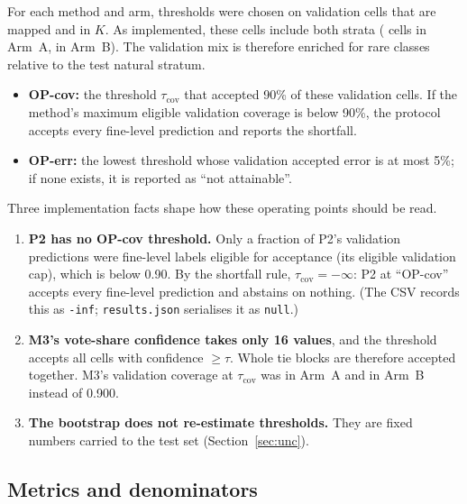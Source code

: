 \documentclass[11pt]{article}
\begin{document}
For each method and arm, thresholds were chosen on validation cells that are mapped and in $K$. As implemented, these cells include both strata ( cells in Arm~A,  in Arm~B). The validation mix is therefore enriched for rare classes relative to the test natural stratum.

\begin{itemize}
\item \textbf{OP-cov:} the threshold $\tau_\mathrm{cov}$ that accepted 90\% of these validation cells. If the method's maximum eligible validation coverage is below 90\%, the protocol accepts every fine-level prediction and reports the shortfall.
\item \textbf{OP-err:} the lowest threshold whose validation accepted error is at most 5\%; if none exists, it is reported as ``not attainable''.
\end{itemize}

\noindent Three implementation facts shape how these operating points should be read.
\begin{enumerate}
\item \textbf{P2 has no OP-cov threshold.} Only a fraction  of P2's validation predictions were fine-level labels eligible for acceptance (its eligible validation cap), which is below 0.90. By the shortfall rule, $\tau_\mathrm{cov}=-\infty$: P2 at ``OP-cov'' accepts every fine-level prediction and abstains on nothing. (The CSV records this as \texttt{-inf}; \texttt{results.json} serialises it as \texttt{null}.)
\item \textbf{M3's vote-share confidence takes only 16 values}, and the threshold accepts all cells with confidence $\ge\tau$. Whole tie blocks are therefore accepted together. M3's validation coverage at $\tau_\mathrm{cov}$ was  in Arm~A and  in Arm~B instead of 0.900.
\item \textbf{The bootstrap does not re-estimate thresholds.} They are fixed numbers carried to the test set (Section~\ref{sec:unc}).
\end{enumerate}

\subsection{Metrics and denominators}
\end{document}
